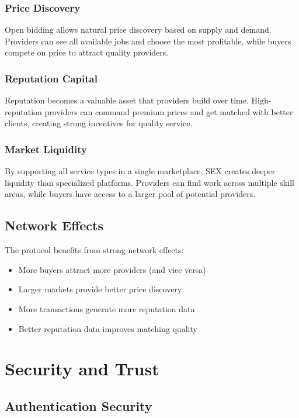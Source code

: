 \documentclass[11pt,a4paper]{article}
\begin{document}
\subsubsection{Price Discovery}

Open bidding allows natural price discovery based on supply and demand. Providers can see all available jobs and choose the most profitable, while buyers compete on price to attract quality providers.

\subsubsection{Reputation Capital}

Reputation becomes a valuable asset that providers build over time. High-reputation providers can command premium prices and get matched with better clients, creating strong incentives for quality service.

\subsubsection{Market Liquidity}

By supporting all service types in a single marketplace, SEX creates deeper liquidity than specialized platforms. Providers can find work across multiple skill areas, while buyers have access to a larger pool of potential providers.

\subsection{Network Effects}

The protocol benefits from strong network effects:

\begin{itemize}
    \item More buyers attract more providers (and vice versa)
    \item Larger markets provide better price discovery
    \item More transactions generate more reputation data
    \item Better reputation data improves matching quality
\end{itemize}

\section{Security and Trust}

\subsection{Authentication Security}
\end{document}

